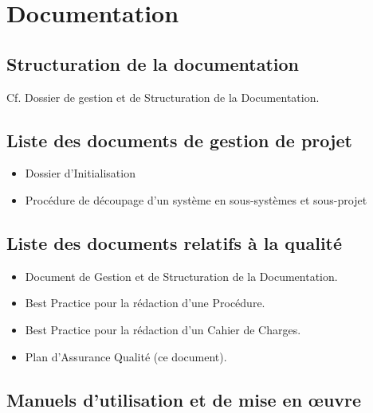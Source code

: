 \section{Documentation}

\subsection{Structuration de la documentation}

Cf. Dossier de gestion et de Structuration de la Documentation.

\subsection{Liste des documents de gestion de projet}

\begin{itemize}
    \item Dossier d'Initialisation
    \item Procédure de découpage d'un système en sous-systèmes et sous-projet
\end{itemize}

\subsection{Liste des documents relatifs à la qualité}

\begin{itemize}
    \item Document de Gestion et de Structuration de la Documentation.
    \item Best Practice pour la rédaction d'une Procédure.
    \item Best Practice pour la rédaction d'un Cahier de Charges.
    \item Plan d'Assurance Qualité (ce document).
\end{itemize}

\subsection{Manuels d'utilisation et de mise en \oe{}uvre}


